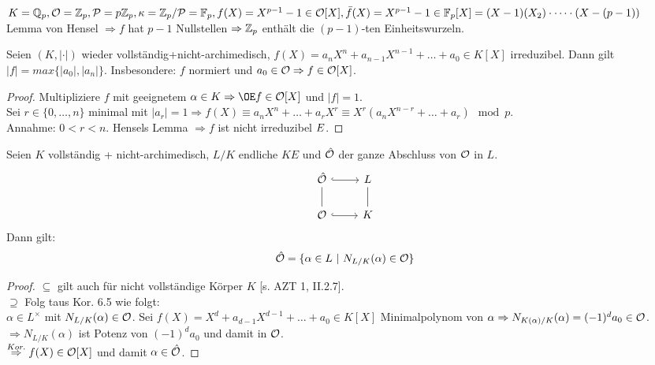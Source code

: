 \begin{Bsp}
$K=\mathbb{Q}_p, \mathcal{O}=\mathbb{Z}_p, \mathcal{P}=p\mathbb{Z}_p, \kappa = \mathbb{Z}_p/\mathcal{P}=\mathbb{F}_p, f(X)=X^{p-1}-1 \in \mathcal{O}[X], \bar{f}(X)=X^{p-1} -1 \in \mathbb{F}_p[X]=(X-1)(X_2)\cdot \dots \cdot (X-(p-1))$\\
Lemma von Hensel $\Rightarrow f$ hat $p-1$ Nullstellen $\Rightarrow \mathbb{Z}_p$ enthält die $(p-1)$-ten Einheitswurzeln.
\end{Bsp}

\begin{Kor}
Seien $(K, |\cdot|)$ wieder vollständig+nicht-archimedisch, $f(X)=a_nX^n+a_{n-1}X^{n-1} + \dots + a_0 \in K[X]$ irreduzibel. Dann gilt $|f|=max\{|a_0|, |a_n|\}$. Insbesondere: $f$ normiert und $a_0 \in \mathcal{O} \Rightarrow f \in \mathcal{O}[X]$.
\end{Kor}

\begin{proof}
Multipliziere $f$ mit geeignetem $\alpha \in K \Rightarrow \OE f \in \O[X]$ und $|f|=1$.\\
Sei $r \in \{0, \dots, n\}$ minimal mit $|a_r|=1 \Rightarrow f(X)\equiv a_nX^n+\dots+a_rX^r \equiv X^r(a_nX^{n-r}+ \dots +a_r) \mod p$.\\
Annahme: $0 < r< n$. Hensels Lemma $\Rightarrow f$ ist nicht irreduzibel $\Lightning$.
\end{proof}

\begin{Lem}
Seien $K$ vollständig + nicht-archimedisch, $L/K$ endliche $KE$ und $\hat{\mathcal{O}}$ der ganze Abschluss von $\mathcal{O}$ in $L$.
\[\begin{tikzcd}
\hO \arrow[r, hookrightarrow] & L\\
\O \arrow[u, dash] \arrow[r, hookrightarrow] & K \arrow[u, dash]
\end{tikzcd}\]
Dann gilt:
\[\hat{\mathcal{O}}=\{\alpha \in L \ | \ N_{L/K}(\alpha) \in \mathcal{O}\}\]
\end{Lem}

\begin{proof}
\glqq $\subseteq$ \grqq gilt auch für nicht vollständige Körper $K$ [s. AZT 1, II.2.7].\\
\glqq $\supseteq$ \grqq Folg taus Kor. 6.5 wie folgt:\\
$\alpha \in L^\times$ mit $N_{L/K}(\alpha) \in \mathcal{O}$. Sei $f(X)=X^d+a_{d-1} X^{d-1}+\dots+a_0 \in K[X]$ Minimalpolynom von $\alpha \Rightarrow N_{K(\alpha)/K}(\alpha)=(-1)^da_0 \in \mathcal{O}$.\\
$\Rightarrow N_{L/K}(\alpha)$ ist Potenz von $(-1)^d a_0$ und damit in $\mathcal{O}$.\\
$\stackrel{Kor.}{\Rightarrow} f(X) \in \mathcal{O}[X]$ und damit $\alpha \in \hat{\mathcal{O}}$.
\end{proof}

